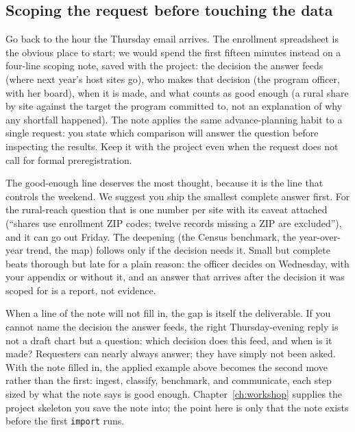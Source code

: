 \subsection{Scoping the request before touching the data}\label{sec:ch01-sc-scoping}
Go back to the hour the Thursday email arrives. The enrollment spreadsheet is the obvious place to start; we would spend the first fifteen minutes instead on a four-line scoping note, saved with the project: the decision the answer feeds (where next year's host sites go), who makes that decision (the program officer, with her board), when it is made, and what counts as good enough (a rural share by site against the target the program committed to, not an explanation of why any shortfall happened). The note applies the same advance-planning habit to a single request: you state which comparison will answer the question before inspecting the results. Keep it with the project even when the request does not call for formal preregistration.

The good-enough line deserves the most thought, because it is the line that controls the weekend. We suggest you ship the smallest complete answer first. For the rural-reach question that is one number per site with its caveat attached (\enquote{shares use enrollment ZIP codes; twelve records missing a ZIP are excluded}), and it can go out Friday. The deepening (the Census benchmark, the year-over-year trend, the map) follows only if the decision needs it. Small but complete beats thorough but late for a plain reason: the officer decides on Wednesday, with your appendix or without it, and an answer that arrives after the decision it was scoped for is a report, not evidence.

When a line of the note will not fill in, the gap is itself the deliverable. If you cannot name the decision the answer feeds, the right Thursday-evening reply is not a draft chart but a question: which decision does this feed, and when is it made? Requesters can nearly always answer; they have simply not been asked. With the note filled in, the applied example above becomes the second move rather than the first: ingest, classify, benchmark, and communicate, each step sized by what the note says is good enough. Chapter~\ref{ch:workshop} supplies the project skeleton you save the note into; the point here is only that the note exists before the first \texttt{import} runs.

